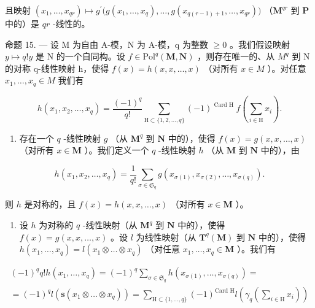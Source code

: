 且映射 \((x_{1},\ldots ,x_{qr})\mapsto g^{\prime}\big(g(x_{1},\dots,x_{q}),\dots,g(x_{q(r - 1) + 1},\dots,x_{qr})\big)\) （\(\mathbf{M}^{qr}\) 到 \(\mathbf{P}\) 中的）是 \(qr\) -线性的。

命题 15. --- 设 M 为自由 A-模，N 为 A-模，q 为整数 \(\geqslant0\) 。我们假设映射 \(y\mapsto q!y\) 是 N 的一个自同构。设 \(f\in\mathrm{Pol}^{q}(\mathbf{M},\mathbf{N})\) ，则存在唯一的、从 \(M^{q}\) 到 N 的对称 q-线性映射 h，使得 \(f(x)=h(x,x,\ldots,x)\) （对所有 \(x\in M\) ）。对任意 \(x_{1},\ldots,x_{q}\in M\) 我们有

\[
h \left(x _ {1}, x _ {2}, \dots , x _ {q}\right) = \frac {(- 1) ^ {q}}{q !} \sum_ {\mathrm{H} \subset \{1, 2, \dots , q \}} (- 1) ^ {\text { Card   H }} f \left(\sum_ {i \in \mathrm{H}} x _ {i}\right).\tag{16}
\]

\begin{enumerate}
\def\labelenumi{\alph{enumi})}
\tightlist
\item
  存在一个 \(q\) -线性映射 \(g\) （从 \(\mathbf{M}^q\) 到 \(\mathbf{N}\) 中的），使得 \(f(x) = g(x, x, \ldots, x)\) （对所有 \(x \in \mathbf{M}\) ）。我们定义一个 \(q\) -线性映射 \(h\) （从 \(\mathbf{M}\) 到 \(\mathbf{N}\) 中的），由
\end{enumerate}

\[
h \left(x _ {1}, x _ {2}, \dots , x _ {q}\right) = \frac {1}{q !} \sum_ {\sigma \in \mathfrak {S} _ {q}} g \left(x _ {\sigma (1)}, x _ {\sigma (2)}, \dots , x _ {\sigma (q)}\right).
\]

则 \(h\) 是对称的，且 \(f(x) = h(x, x, \ldots, x)\) （对所有 \(x \in \mathbf{M}\) ）。

\begin{enumerate}
\def\labelenumi{\alph{enumi})}
\setcounter{enumi}{1}
\tightlist
\item
  设 \(h\) 为对称的 \(q\) -线性映射（从 \(\mathbf{M}^q\) 到 \(\mathbf{N}\) 中的），使得 \(f(x) = g(x, x, \ldots, x)\) 。设 \(l\) 为线性映射（从 \(\mathbf{T}^q(\mathbf{M})\) 到 \(\mathbf{N}\) 中的），使得 \(h(x_1, \ldots, x_q) = l(x_1 \otimes \ldots \otimes x_q)\) （对任意 \(x_1, \ldots, x_q \in \mathbf{M}\) ）。我们有
\end{enumerate}

\[
\begin{array}{l} (- 1) ^ {q} q! h (x _ {1}, \dots , x _ {q}) = (- 1) ^ {q} \sum_ {\sigma \in \mathfrak {S} _ {q}} h (x _ {\sigma (1)}, \dots , x _ {\sigma (q)}) = \\ = (- 1) ^ {q} l (\mathbf {s} (x _ {1} \otimes \dots \otimes x _ {q})) = \sum_ {\mathrm{H} \subset \{1, \dots , q \}} (- 1) ^ {\text {Card H}} l \left(\gamma_ {q} \left(\sum_ {i \in \mathrm{H}} x _ {i}\right)\right) \end{array}
\]

